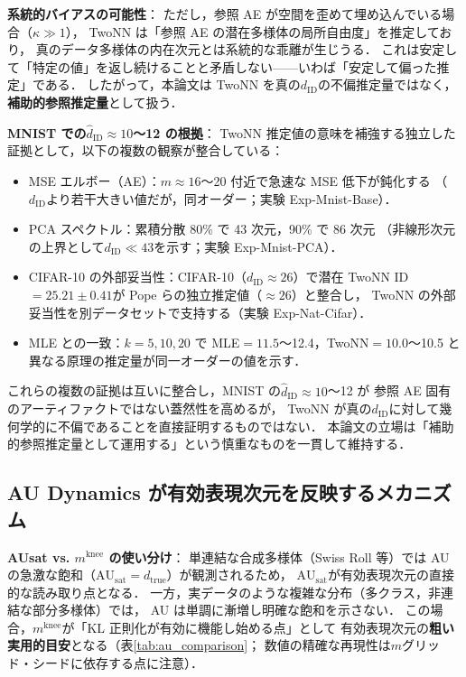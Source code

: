 \documentclass[11pt,a4paper]{jsarticle}
\newcommand{\dtrue}{d_{\mathrm{true}}}
\newcommand{\AUsat}{\mathrm{AU}_{\mathrm{sat}}}
\newcommand{\mknee}{m^{\mathrm{knee}}}
\begin{document}
\textbf{系統的バイアスの可能性}：
ただし，参照 AE が空間を歪めて埋め込んでいる場合（$\kappa \gg 1$），
TwoNN は「参照 AE の潜在多様体の局所自由度」を推定しており，
真のデータ多様体の内在次元とは系統的な乖離が生じうる．
これは安定して「特定の値」を返し続けることと矛盾しない——いわば「安定して偏った推定」である．
したがって，本論文は TwoNN を真の$d_\mathrm{ID}$の不偏推定量ではなく，
\textbf{補助的参照推定量}として扱う．

\textbf{MNIST での$\hat{d}_\mathrm{ID} \approx 10$〜12 の根拠}：
TwoNN 推定値の意味を補強する独立した証拠として，以下の複数の観察が整合している：
\begin{itemize}
  \item MSE エルボー（AE）：$m \approx 16$〜20 付近で急速な MSE 低下が鈍化する
        （$d_\mathrm{ID}$より若干大きい値だが，同オーダー；実験 Exp-Mnist-Base）．
  \item PCA スペクトル：累積分散 80\% で 43 次元，90\% で 86 次元
        （非線形次元の上界として$d_\mathrm{ID} \ll 43$を示す；実験 Exp-Mnist-PCA）．
  \item CIFAR-10 の外部妥当性：CIFAR-10（$d_\mathrm{ID} \approx 26$）で潜在 TwoNN ID$=25.21\pm0.41$が
        Pope ら\cite{pope2021intrinsic}の独立推定値（$\approx26$）と整合し，
        TwoNN の外部妥当性を別データセットで支持する（実験 Exp-Nat-Cifar）．
  \item MLE との一致：$k=5,10,20$ で MLE$=11.5$〜12.4，TwoNN$=10.0$〜10.5 と
        異なる原理の推定量が同一オーダーの値を示す．
\end{itemize}
これらの複数の証拠は互いに整合し，MNIST の$\hat{d}_\mathrm{ID} \approx 10$〜12 が
参照 AE 固有のアーティファクトではない蓋然性を高めるが，
TwoNN が真の$d_\mathrm{ID}$に対して幾何学的に不偏であることを直接証明するものではない．
本論文の立場は「補助的参照推定量として運用する」という慎重なものを一貫して維持する．

\subsection{AU Dynamics が有効表現次元を反映するメカニズム}\label{sec:disc_au_dynamics}

\textbf{AUsat vs. $\mknee$ の使い分け}：
単連結な合成多様体（Swiss Roll 等）では AU の急激な飽和（$\AUsat = \dtrue$）が観測されるため，
$\AUsat$が有効表現次元の直接的な読み取り点となる．
一方，実データのような複雑な分布（多クラス，非連結な部分多様体）では，
AU は単調に漸増し明確な飽和を示さない．
この場合，$\mknee$が「KL 正則化が有効に機能し始める点」として
有効表現次元の\textbf{粗い実用的目安}となる（表\ref{tab:au_comparison}；
数値の精確な再現性は$m$グリッド・シードに依存する点に注意）．
\end{document}
